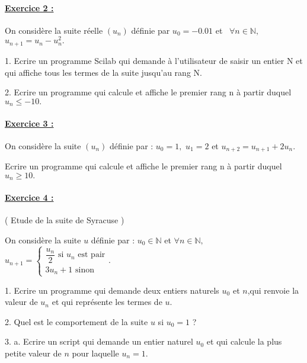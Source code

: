 \documentclass{article}
\begin{document}
\paragraph{\protect\underline{Exercice 2 : }}

On consid\`{e}re la suite r\'{e}elle $\left( u_{n}\right) $ d\'{e}finie par $%
u_{0}=-0.01$ et \ $\forall n\in \mathbb{N},$ \ $u_{n+1}=u_{n}-u_{n}^{2}.$

1. Ecrire un programme Scilab qui demande \`{a} l'utilisateur de saisir un
entier N et qui affiche tous les termes de la suite jusqu'au rang N.

2. Ecrire un programme qui calcule et affiche le premier rang n \`{a} partir
duquel $u_{n}\leq -10.$

\bigskip

\paragraph{\protect\underline{Exercice 3 :}}

On consid\`{e}re la suite $\left( u_{n}\right) $ d\'{e}finie par : $u_{0}=1,$
$u_{1}=2$ et $u_{n+2}=u_{n+1}+2u_{n}.$ \ 

Ecrire un programme qui calcule et affiche le premier rang n \`{a} partir
duquel $u_{n}\geq 10.$

\paragraph{\protect\underline{Exercice 4 :}}

( Etude de la suite de Syracuse )

On consid\`{e}re la suite $u$ d\'{e}finie par : $u_{0}\in 
\mathbb{N}
$ et $\forall n\in 
\mathbb{N}
,$ \ $u_{n+1}=\left\{ 
\begin{array}{c}
\dfrac{u_{n}}{2}\text{ si }u_{n}\text{ est pair} \\ 
3u_{n}+1\text{ \ \ \ sinon}%
\end{array}%
\right. .$

1. Ecrire un programme qui demande deux entiers naturels $u_{0}$ et $n$,qui
renvoie la valeur de $u_{n}$ et qui repr\'{e}sente les termes de $u.$

2. Quel est le comportement de la suite $u$ si $u_{0}=1$ ?

3. a. Ecrire un script qui demande un entier naturel $u_{0}$ et qui calcule
la plus petite valeur de $n$ pour laquelle $u_{n}=1.$
\end{document}
